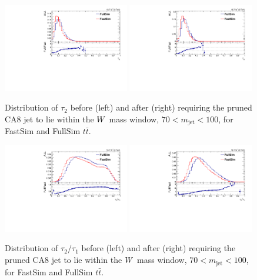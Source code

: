 \begin{figure}[p]
\includegraphics[width=0.49\textwidth]{figures/razor_wtag/FastFull_comparison_TTJets_tau2}
\includegraphics[width=0.49\textwidth]{figures/razor_wtag/FastFull_comparison_TTJets_tau2_masscut}
\caption{Distribution of $\tau_2$ before (left) and after (right) requiring the pruned CA8 jet to
lie within the $W$ mass window, $70 < m_{\textrm{jet}} < 100$\GeV, for FastSim and FullSim
$t\bar{t}$.
\label{fig:FastFull_tau2}}
\end{figure}

\begin{figure}[p]
\includegraphics[width=0.49\textwidth]{figures/razor_wtag/FastFull_comparison_TTJets_tau21}
\includegraphics[width=0.49\textwidth]{figures/razor_wtag/FastFull_comparison_TTJets_tau21_masscut}
\caption{Distribution of $\tau_2/\tau_1$ before (left) and after (right) requiring the pruned CA8
jet to lie within the $W$ mass window, $70 < m_{\textrm{jet}} < 100$\GeV, for FastSim and FullSim
$t\bar{t}$.
\label{fig:FastFull_tau21}}
\end{figure}


